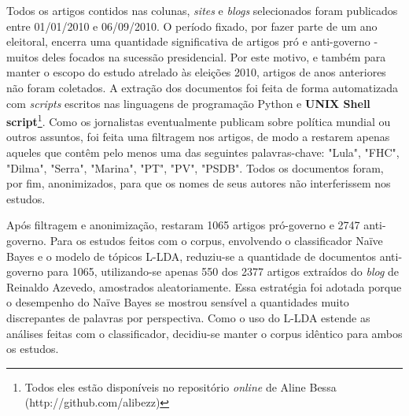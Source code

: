 Todos os artigos contidos nas colunas, \emph{sites} e \emph{blogs} selecionados foram  publicados entre 01/01/2010 e 06/09/2010. O período fixado, por fazer parte de um ano eleitoral, encerra uma quantidade significativa de artigos pró e anti-governo - muitos deles focados na sucessão presidencial. Por este motivo, e também para manter o escopo do estudo atrelado às eleições 2010, artigos de anos anteriores não foram coletados. A extração dos documentos foi feita de forma automatizada com \emph{scripts} escritos nas linguagens de programação Python e \textbf{UNIX Shell script}\footnote{Todos eles estão disponíveis no repositório \emph{online} de Aline Bessa (http://github.com/alibezz)}. Como os jornalistas eventualmente publicam sobre política mundial ou outros assuntos, foi feita uma filtragem nos artigos, de modo a restarem apenas aqueles que contêm pelo menos uma das seguintes palavras-chave: "Lula", "FHC", "Dilma", "Serra", "Marina", "PT", "PV", "PSDB". Todos os documentos foram, por fim, anonimizados, para que os nomes de seus autores não interferissem nos estudos. 


Após filtragem e anonimização, restaram 1065 artigos pró-governo e 2747 anti-governo. Para os estudos feitos com o corpus, envolvendo o classificador Naïve Bayes e o modelo de tópicos L-LDA, reduziu-se a quantidade de documentos anti-governo para 1065, utilizando-se apenas 550 dos 2377 artigos extraídos do \emph{blog} de Reinaldo Azevedo, amostrados aleatoriamente. Essa estratégia foi adotada porque o desempenho do  Naïve Bayes se mostrou sensível a quantidades muito discrepantes de palavras por perspectiva. Como o uso do L-LDA estende as análises feitas com o classificador, decidiu-se manter o corpus idêntico para ambos os estudos. 

